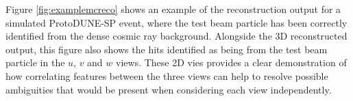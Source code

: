 Figure \ref{fig:examplemcreco} shows an example of the reconstruction output for a simulated ProtoDUNE-SP event, where the test beam particle has been correctly identified from the dense cosmic ray background.  Alongside the 3D reconstructed output, this figure also shows the hits identified as being from the test beam particle in the $u$, $v$ and $w$ views.  These 2D vies provides a clear demonstration of how correlating features between the three views can help to resolve possible ambiguities that would be present when considering each view independently.

\begin{figure}
\centering
{} \\

\end{figure}
